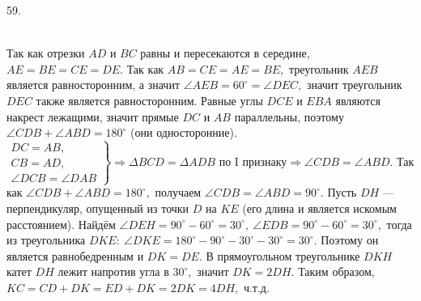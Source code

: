 \documentclass[12pt]{article}
\begin{document}
59. \begin{figure}[ht!]
\end{figure}\\
Так как отрезки $AD$ и $BC$ равны и пересекаются в середине, $AE=BE=CE=DE.$ Так как $AB=CE=AE=BE,$ треугольник $AEB$ является равносторонним, а значит $\angle AEB=60^\circ=\angle DEC,$ значит треугольник $DEC$ также является равносторонним. Равные углы $DCE$ и $EBA$ являются накрест лежащими, значит прямые $DC$ и $AB$ параллельны, поэтому $\angle CDB+\angle ABD=180^\circ$ (они односторонние). $\left.\begin{array}{l}DC=AB,\\
CB=AD,\\
\angle DCB=\angle DAB  \end{array}\right\}\Rightarrow \Delta BCD=\Delta ADB\text{ по I признаку}\Rightarrow \angle CDB=\angle ABD.$ Так как $\angle CDB+\angle ABD=180^\circ,$ получаем $\angle CDB=\angle ABD=90^\circ.$ Пусть $DH$ --- перпендикуляр, опущенный из точки $D$ на $KE$ (его длина и является искомым расстоянием). Найдём $\angle DEH=90^\circ-60^\circ=30^\circ,\ \angle EDB=90^\circ-60^\circ=30^\circ,$ тогда из треугольника $DKE:\ \angle DKE=180^\circ-90^\circ-30^\circ-30^\circ=30^\circ.$ Поэтому он является равнобедренным и $DK=DE.$ В прямоугольном треугольнике $DKH$ катет $DH$ лежит напротив угла в $30^\circ,$ значит $DK=2DH.$ Таким образом, $KC=CD+DK=ED+DK=2DK=4DH,$ ч.т.д.\\
\end{document}
